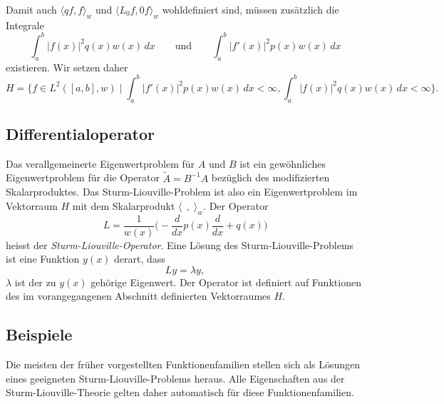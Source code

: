 Damit auch $\langle qf,f\rangle_w$ und $\langle L_0f,0f\rangle_w$
wohldefiniert sind, müssen zusätzlich die Integrale
\[
\int_a^b |f(x)|^2 q(x) w(x)\,dx
\qquad\text{und}\qquad
\int_a^b |f'(x)|^2 p(x) w(x)\,dx
\]
existieren.
Wir setzen daher
\[
H
=
\biggl\{
f\in L^2([a,b],w)\;\bigg|\;
\int_a^b |f'(x)|^2p(x)w(x)\,dx<\infty,
\int_a^b |f(x)|^2q(x)w(x)\,dx<\infty
\biggr\}.
\]

\subsection{Differentialoperator}
Das verallgemeinerte Eigenwertproblem für $A$ und $B$ ist ein
gewöhnliches Eigenwertproblem für die Operator $\tilde{A}=B^{-1}A$
bezüglich des modifizierten Skalarproduktes.
Das Sturm-Liouville-Problem ist also ein Eigenwertproblem im
Vektorraum $H$ mit dem Skalarprodukt $\langle\,\;,\;\rangle_w$.
Der Operator
\[
L = \frac{1}{w(x)} \biggl(-\frac{d}{dx} p(x)\frac{d}{dx} + q(x)\biggr)
\]
heisst der {\em Sturm-Liouville-Operator}.
Eine Lösung des Sturm-Liouville-Problems ist eine Funktion $y(x)$ derart,
dass 
\[
Ly = \lambda y,
\]
$\lambda$ ist der zu $y(x)$ gehörige Eigenwert.
Der Operator ist definiert auf Funktionen des im vorangegangenen Abschnitt
definierten Vektorraumes $H$.

\subsection{Beispiele}
Die meisten der früher vorgestellten Funktionenfamilien stellen sich
als Lösungen eines geeigneten Sturm-Liouville-Problems heraus.
Alle Eigenschaften aus der Sturm-Liouville-Theorie gelten daher
automatisch für diese Funktionenfamilien.

